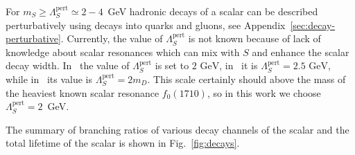 \documentclass[a4paper,12pt,dvipsnames,usernames]{article}
\begin{document}
For $m_S \geq \Lambda_{S}^{\text{pert}} \simeq 2-4$~GeV hadronic decays of a scalar can be described perturbatively using decays into quarks and gluons, see Appendix~\ref{sec:decay-perturbative}. Currently, the value of $\Lambda_{S}^{\text{pert}}$ is not known because of lack of knowledge about scalar resonances which can mix with $S$ and enhance the scalar decay width. In~\cite{Winkler:2018qyg} the value of $\Lambda_{S}^{\text{pert}}$ is set to $2\text{ GeV}$, in~\cite{Bezrukov:2009yw} it is $\Lambda_{S}^{\text{pert}} = 2.5\text{ GeV}$, while in~\cite{Evans:2017lvd} its value is $\Lambda_{S}^{\text{pert}} = 2m_{D}$. This scale certainly should above the mass of the heaviest known scalar resonance $f_{0}(1710)$, so in this work we choose $\Lambda_{S}^{\text{pert}} = 2$~GeV.


The summary of branching ratios of various decay channels of the scalar and the total lifetime of the scalar is shown in Fig.~\ref{fig:decays}.
\end{document}
